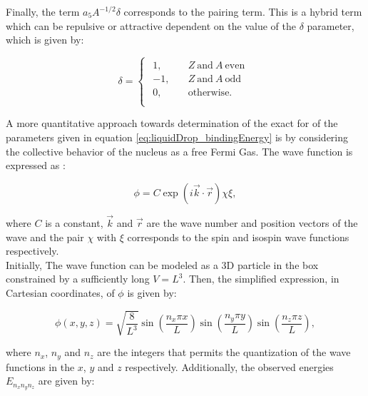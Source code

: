 \documentclass[openany]{book}
\begin{document}
Finally, the term $a_5 A^{-1/2} \delta$ corresponds to the pairing term. This is a hybrid term which can be repulsive or attractive dependent on the value of the $\delta$ parameter, which is given by:

\begin{equation} \label{eq:liquidDrop_deltaFactor}
	\delta = 	\left\{\begin{array}{l}
		\begin{split}
			1, \quad & Z \ \mathrm{and} \ A \  \mathrm{even} \\ 
			-1, \quad &  Z \ \mathrm{and} \ A \  \mathrm{odd} 	\\
			0, \quad & \mathrm{otherwise}.	\\
		\end{split}
	\end{array}\right.
\end{equation}

A more quantitative approach towards determination of the exact for of the parameters given in equation \ref{eq:liquidDrop_bindingEnergy} is by considering the collective behavior of the nucleus as a free Fermi Gas. The wave function is expressed as \cite{bohr_mottelson_1998}: 

\begin{equation}\label{eq:liquidDrop_FermiGas}
	\phi = C \exp (i \vec k \cdot \vec r) \chi \xi, 
\end{equation}

where $C$ is a constant, $\vec k$ and $\vec r$ are the wave number and position vectors of the wave and the pair $\chi$ with $ \xi$ corresponds to the spin and isospin wave functions respectively. \\

Initially, The wave function can be modeled as a 3D particle in the box constrained by a sufficiently long $V = L^3$. Then, the simplified expression, in Cartesian coordinates, of $\phi$ is given by:

\begin{equation}\label{eq:liquidDrop_FermiGas_wavefunction}
	\phi(x, y, z) = \sqrt{\frac{8}{L^3}} \sin \left( \frac{n_x \pi x }{L}\right)  \sin \left( \frac{n_y \pi y }{L}\right)  \sin \left( \frac{n_z \pi z }{L}\right),
\end{equation}

where $n_x$, $n_y$ and $n_z$ are the integers that permits the quantization of the wave functions in the $x$, $y$ and $z$ respectively. Additionally, the observed energies $E_{n_xn_yn_z}$ are given by: 
\end{document}
